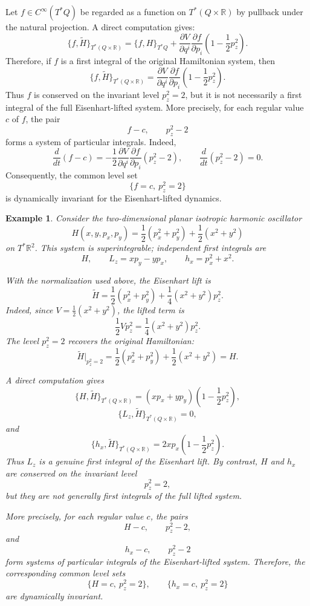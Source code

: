 \documentclass[10pt,a4paper]{article}
\newtheorem{example}{Example}
\begin{document}
Let \(f\in C^\infty(T^*Q)\) be regarded as a function on \(T^*(Q\times\mathbb R)\) by pullback under the natural projection. A direct computation gives:
\begin{equation*}
\label{eq:eisenhartbracket}
\{f,\widetilde H\}_{T^*(Q\times\mathbb R)}
=
\{f,H\}_{T^*Q}
+
\frac{\partial V}{\partial q^i}
\frac{\partial f}{\partial p_i}
\left(1-\frac{1}{2}p_z^2\right).
\end{equation*}
Therefore, if \(f\) is a first integral of the original Hamiltonian system, then
\begin{equation*}
\{f,\widetilde H\}_{T^*(Q\times\mathbb R)}
=
\frac{\partial V}{\partial q^i}
\frac{\partial f}{\partial p_i}
\left(1-\frac{1}{2}p_z^2\right).
\end{equation*}
Thus \(f\) is conserved on the invariant level \(p_z^2=2\), but it is not necessarily a first integral of the full Eisenhart-lifted system. More precisely, for each regular value \(c\) of \(f\), the pair
\[
f-c,
\qquad
p_z^2-2
\]
forms a system of particular integrals. Indeed,
\begin{equation*}
\frac{d}{dt}(f-c)
=
-\frac{1}{2}
\frac{\partial V}{\partial q^i}
\frac{\partial f}{\partial p_i}
\left(p_z^2-2\right),
\qquad
\frac{d}{dt}(p_z^2-2)=0.
\end{equation*}
Consequently, the common level set
\[
\{f=c,\ p_z^2=2\}
\]
is dynamically invariant for the Eisenhart-lifted dynamics.
\begin{example}
\label{ex:eisenhartharmonicoscillator}
Consider the two-dimensional planar isotropic harmonic oscillator
\[
H(x,y,p_x,p_y)
=
\frac{1}{2}(p_x^2+p_y^2)
+
\frac{1}{2}(x^2+y^2)
\]
on \(T^*\mathbb R^2\). This system is superintegrable; independent first integrals are
\[
H,\qquad
L_z=xp_y-yp_x,\qquad
h_x=p_x^2+x^2 .
\]

With the normalization used above, the Eisenhart lift is
\[
\widetilde H
=
\frac{1}{2}(p_x^2+p_y^2)
+
\frac{1}{4}(x^2+y^2)p_z^2 .
\]
Indeed, since \(V=\frac12(x^2+y^2)\), the lifted term is
\[
\frac12 Vp_z^2
=
\frac14(x^2+y^2)p_z^2 .
\]
The level \(p_z^2=2\) recovers the original Hamiltonian:
\[
\widetilde H|_{p_z^2=2}
=
\frac{1}{2}(p_x^2+p_y^2)
+
\frac{1}{2}(x^2+y^2)
=
H.
\]

A direct computation gives
\[
\{H,\widetilde H\}_{T^*(Q\times\mathbb R)}
=
(xp_x+yp_y)
\left(1-\frac12p_z^2\right),
\]
\[
\{L_z,\widetilde H\}_{T^*(Q\times\mathbb R)}
=
0,
\]
and
\[
\{h_x,\widetilde H\}_{T^*(Q\times\mathbb R)}
=
2xp_x
\left(1-\frac12p_z^2\right).
\]
Thus \(L_z\) is a genuine first integral of the Eisenhart lift. By contrast, \(H\) and \(h_x\) are conserved on the invariant level
\[
p_z^2=2,
\]
but they are not generally first integrals of the full lifted system.

More precisely, for each regular value \(c\), the pairs
\[
H-c,\qquad p_z^2-2,
\]
and
\[
h_x-c,\qquad p_z^2-2
\]
form systems of particular integrals of the Eisenhart-lifted system. Therefore, the corresponding common level sets
\[
\{H=c,\ p_z^2=2\},
\qquad
\{h_x=c,\ p_z^2=2\}
\]
are dynamically invariant.
\end{example}
\end{document}

